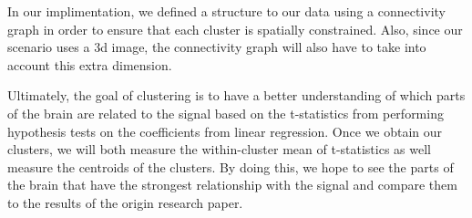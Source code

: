 In our implimentation, we defined a structure to our data using a connectivity
graph in order to ensure that each cluster is spatially constrained. Also,
since our scenario uses a 3d image, the connectivity graph will also have to
take into account this extra dimension.


\par Ultimately, the goal of clustering is to have a better understanding of 
which parts of the brain are related to the signal based on the t-statistics 
from performing hypothesis tests on the coefficients from linear regression.
Once we obtain our clusters, we will both measure the within-cluster mean of
t-statistics as well measure the centroids of the clusters. By doing this, we hope
to see the parts of the brain that have the strongest relationship with the
signal and compare them to the results of the origin research paper.

